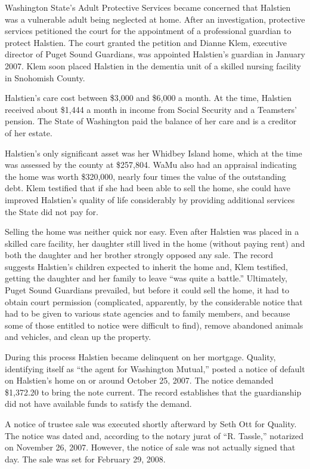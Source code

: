 Washington State's Adult Protective Services became concerned that
Halstien was a vulnerable adult being neglected at home. After an
investigation, protective services petitioned the court for the appointment of
a professional guardian to protect Halstien. The court granted the petition and
Dianne Klem, executive director of Puget Sound Guardians, was appointed
Halstien's guardian in January 2007. Klem soon placed Halstien in the dementia
unit of a skilled nursing facility in Snohomish County.

Halstien's care cost between \$3,000 and \$6,000 a month. At the time,
Halstien received about \$1,444 a month in income from Social Security and a
Teamsters' pension. The State of Washington paid the balance of her care and is
a creditor of her estate.

Halstien's only significant asset was her Whidbey Island home, which at
the time was assessed by the county at \$257,804. WaMu also had an appraisal
indicating the home was worth \$320,000, nearly four times the value of the
outstanding debt. Klem testified that if she had been able to sell the home,
she could have improved Halstien's quality of life considerably by providing
additional services the State did not pay for.

Selling the home was neither quick nor easy. Even after Halstien was
placed in a skilled care facility, her daughter still lived in the home
(without paying rent) and both the daughter and her brother strongly opposed
any sale. The record suggests Halstien's children expected to inherit the home
and, Klem testified, getting the daughter and her family to leave ``was quite a
battle.'' Ultimately, Puget Sound Guardians prevailed, but before it could sell
the home, it had to obtain court permission (complicated, apparently, by the
considerable notice that had to be given to various state agencies and to
family members, and because some of those entitled to notice were difficult to
find), remove abandoned animals and vehicles, and clean up the property. 

During this process Halstien became delinquent on her mortgage. Quality,
identifying itself as ``the agent for Washington Mutual,'' posted a notice of
default on Halstien's home on or around October 25, 2007. The notice demanded
\$1,372.20 to bring the note current. The record establishes that the
guardianship did not have available funds to satisfy the demand.

A notice of trustee sale was executed shortly afterward by Seth Ott for
Quality. The notice was dated and, according to the notary jurat of ``R.
Tassle,'' notarized on November 26, 2007. However, the notice of sale was not
actually signed that day. The sale was set for February 29, 2008.


